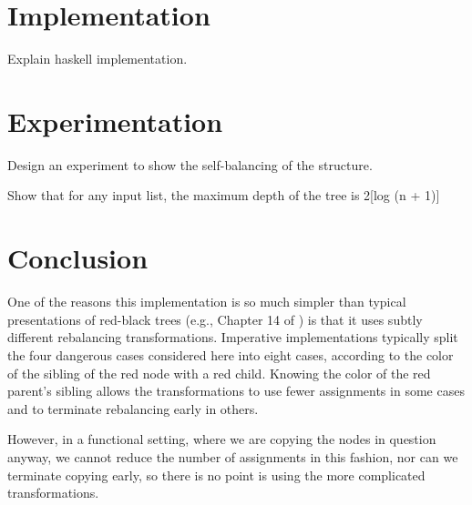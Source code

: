 \documentclass[12pt, a4paper]{article} %
\begin{document}
\section{Implementation}\label{s:implementation}

Explain haskell implementation.

\section{Experimentation}\label{s:experimentation}

Design an experiment to show the self-balancing of the structure.

Show that for any input list, the maximum depth of the tree is 2[log (n + 1)]

\section{Conclusion}\label{s:conclusion}

One of the reasons this implementation is so much  simpler than typical presentations of red-black trees (e.g., Chapter 14 of \cite{clr90}) is that it uses subtly different  rebalancing  transformations.  Imperative implementations typically split the four dangerous cases considered here into eight cases, according to the color  of the sibling  of the red node with a red child.  Knowing the color of the red parent's  sibling allows the transformations  to use fewer  assignments in some cases and to terminate rebalancing early in others.

However, in a functional setting, where we are copying the nodes in question  anyway, we cannot reduce the number  of assignments in this fashion, nor can we terminate copying early, so there is no point is using the more complicated transformations.




\end{document}
